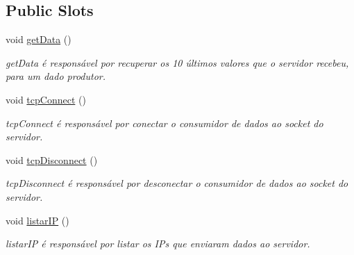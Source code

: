 \subsection*{Public Slots}
\begin{DoxyCompactItemize}
\item 
\mbox{\label{class_main_window_a4a2ddf4cf2ec8e240cc340416b1df792}} 
void \mbox{\hyperlink{class_main_window_a4a2ddf4cf2ec8e240cc340416b1df792}{get\+Data}} ()
\begin{DoxyCompactList}\small\item\em get\+Data é responsável por recuperar os 10 últimos valores que o servidor recebeu, para um dado produtor. \end{DoxyCompactList}\item 
\mbox{\label{class_main_window_ac5b669957c442b6eb68573dacfce33e1}} 
void \mbox{\hyperlink{class_main_window_ac5b669957c442b6eb68573dacfce33e1}{tcp\+Connect}} ()
\begin{DoxyCompactList}\small\item\em tcp\+Connect é responsável por conectar o consumidor de dados ao socket do servidor. \end{DoxyCompactList}\item 
\mbox{\label{class_main_window_a4d22c4c7afc7ba0a2fa4c70515c85dda}} 
void \mbox{\hyperlink{class_main_window_a4d22c4c7afc7ba0a2fa4c70515c85dda}{tcp\+Disconnect}} ()
\begin{DoxyCompactList}\small\item\em tcp\+Disconnect é responsável por desconectar o consumidor de dados ao socket do servidor. \end{DoxyCompactList}\item 
\mbox{\label{class_main_window_a39d1a4a7506fa6f06058870f75b3f62a}} 
void \mbox{\hyperlink{class_main_window_a39d1a4a7506fa6f06058870f75b3f62a}{listar\+IP}} ()
\begin{DoxyCompactList}\small\item\em listar\+IP é responsável por listar os I\+Ps que enviaram dados ao servidor. \end{DoxyCompactList}\item 
\mbox{\label{class_main_window_aa6ee814d80346718dcb56c1b386fcace}} 

\end{DoxyCompactItemize}
